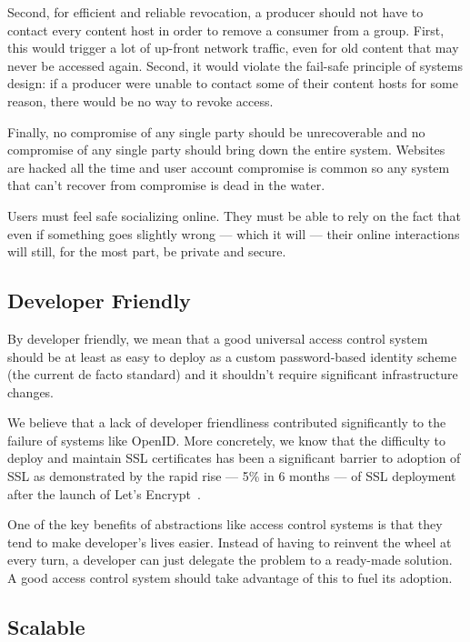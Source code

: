 \documentclass[pdftex,12pt,a4papaer,twoside,notitlepage]{report}
\begin{document}
Second, for efficient and reliable revocation, a producer should not have to
contact every content host in order to remove a consumer from a group. First,
this would trigger a lot of up-front network traffic, even for old content that
may never be accessed again. Second, it would violate the fail-safe principle of
systems design: if a producer were unable to contact some of their content hosts
for some reason, there would be no way to revoke access.

Finally, no compromise of any single party should be unrecoverable and no
compromise of any single party should bring down the entire system. Websites are
hacked all the time and user account compromise is common so any system that
can't recover from compromise is dead in the water.

Users must feel safe socializing online. They must be able to rely on the fact
that even if something goes slightly wrong --- which it will --- their online
interactions will still, for the most part, be private and secure.

\subsection{Developer Friendly}
\label{sub:goal-developer}

By developer friendly, we mean that a good universal access control system
should be at least as easy to deploy as a custom password-based identity scheme
(the current de facto standard) and it shouldn't require significant infrastructure
changes.

We believe that a lack of developer friendliness contributed significantly to
the failure of systems like OpenID\cite{openid}. More concretely, we know that
the difficulty to deploy and maintain SSL certificates has been a significant
barrier to adoption of SSL as demonstrated by the rapid rise --- 5\% in 6 months
--- of SSL deployment after the launch of Let's Encrypt~\cite{lets-encrypt}.

One of the key benefits of abstractions like access control systems is that they
tend to make developer's lives easier. Instead of having to reinvent the wheel
at every turn, a developer can just delegate the problem to a ready-made
solution. A good access control system should take advantage of this to fuel its
adoption.

\subsection{Scalable}
\end{document}
